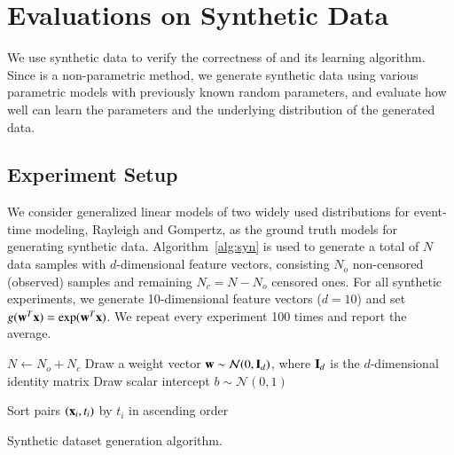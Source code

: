 \section{Evaluations on Synthetic Data}\label{sec:synthetic}
We use synthetic data to verify the correctness of \npglm and its learning algorithm. Since \npglm is a non-parametric method, we generate synthetic data using various parametric models with previously known random parameters, and evaluate how well \npglm can learn the parameters and the underlying distribution of the generated data.

\subsection{Experiment Setup}
We consider generalized linear models of two widely used distributions for event-time modeling, Rayleigh and Gompertz, as the ground truth models for generating synthetic data. Algorithm~\ref{alg:syn} is used to generate a total of $N$ data samples with $d$-dimensional feature vectors, consisting $N_o$ non-censored (observed) samples and remaining $N_c=N-N_o$ censored ones. For all synthetic experiments, we generate 10-dimensional feature vectors ($d=10$) and set $g(\mathbf{w}^T\mathbf{x})=\exp(\mathbf{w}^T\mathbf{x})$. We repeat every experiment 100 times and report the average.

\begin{algorithm}[t]
	\small
	\SetAlgoLined
	$N\leftarrow N_o+N_c$\;
	Draw a weight vector $\mathbf{w}\sim\mathcal{N}(0,\mathbf{I}_d)$, where $\mathbf{I}_d$ is the $d$-dimensional identity matrix\;
	Draw scalar intercept $b\sim\mathcal{N}(0,1)$\;
	
	Sort pairs $(\mathbf{x}_i,t_i)$ by $t_i$ in ascending order\;
	
	\caption{Synthetic dataset generation algorithm.}
	\label{alg:syn}
\end{algorithm}


